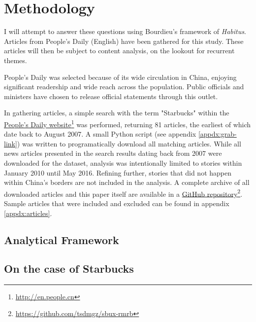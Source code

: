 \chapter{Methodology}\label{chap:methodology}

I will attempt to answer these questions using Bourdieu's framework of
\emph{Habitus}. Articles from People's Daily (English) have been gathered for
this study. These articles will then be subject to content analysis, on the
lookout for recurrent themes.

People's Daily was selected because of its wide circulation in China, enjoying
significant readership and wide reach across the population. Public officials
and ministers have chosen to release official statements through this outlet.

In gathering articles, a simple search with the term "Starbucks" within the
\href{http://en.people.cn}{People's Daily
website}\footnote{\url{http://en.people.cn}} was performed, returning 81
articles, the earliest of which date back to August 2007. A small Python script
(see appendix \autoref{appdx:grab-link}) was written to programatically download
all matching articles. While all news articles presented in the search results
dating back from 2007 were downloaded for the dataset, analysis was
intentionally limited to stories within January 2010 until May 2016. Refining
further, stories that did not happen within China's borders are not included in
the analysis. A complete archive of all downloaded articles and this paper
itself are available in a \href{https://github.com/tsdmgz/sbux-rmrb}{GitHub
repository}\footnote{\url{https://github.com/tsdmgz/sbux-rmrb}}. Sample articles
that were included and excluded can be found in appendix \ref{appdx:articles}.

\section{Analytical Framework}\label{sec:analyticf}


\section{On the case of Starbucks}\label{sec:case-of-sbux}

